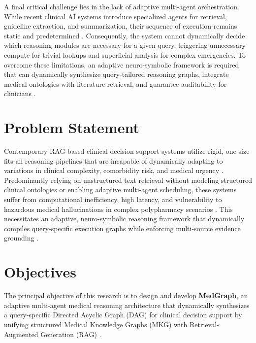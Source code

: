 \documentclass[conference]{IEEEtran}
\begin{document}
A final critical challenge lies in the lack of adaptive multi-agent orchestration. While recent clinical AI systems introduce specialized agents for retrieval, guideline extraction, and summarization, their sequence of execution remains static and predetermined \cite{LAWANNA2026100926,ai6100240}. Consequently, the system cannot dynamically decide which reasoning modules are necessary for a given query, triggering unnecessary compute for trivial lookups and superficial analysis for complex emergencies. To overcome these limitations, an adaptive neuro-symbolic framework is required that can dynamically synthesize query-tailored reasoning graphs, integrate medical ontologies with literature retrieval, and guarantee auditability for clinicians \cite{WANG2025100504,info17020133,BAO2024102768}.

\section{Problem Statement}

Contemporary RAG-based clinical decision support systems utilize rigid, one-size-fits-all reasoning pipelines that are incapable of dynamically adapting to variations in clinical complexity, comorbidity risk, and medical urgency \cite{WANG2025100504,info17020133,ZAKKA2024}. Predominantly relying on unstructured text retrieval without modeling structured clinical ontologies or enabling adaptive multi-agent scheduling, these systems suffer from computational inefficiency, high latency, and vulnerability to hazardous medical hallucinations in complex polypharmacy scenarios \cite{GARCIACARMONA2025,ai6100240,BAO2024102768}. This necessitates an adaptive, neuro-symbolic reasoning framework that dynamically compiles query-specific execution graphs while enforcing multi-source evidence grounding \cite{LAWANNA2026100926,WANG2025100504}.

\section{Objectives}

The principal objective of this research is to design and develop \textbf{MedGraph}, an adaptive multi-agent medical reasoning architecture that dynamically synthesizes a query-specific Directed Acyclic Graph (DAG) for clinical decision support by unifying structured Medical Knowledge Graphs (MKG) with Retrieval-Augmented Generation (RAG) \cite{WANG2025100504,info17020133,ai6100240,BAO2024102768}.
\end{document}
